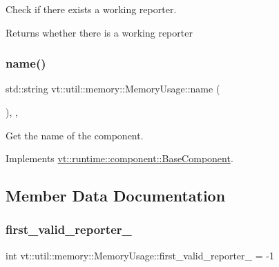 Check if there exists a working reporter. 

\begin{DoxyReturn}{Returns}
whether there is a working reporter 
\end{DoxyReturn}
\mbox{\label{structvt_1_1util_1_1memory_1_1_memory_usage_abd58d8e05874fa3da64e15fef0b9e87f}} 
\subsubsection{\texorpdfstring{name()}{name()}}
{\footnotesize\ttfamily std\+::string vt\+::util\+::memory\+::\+Memory\+Usage\+::name (\begin{DoxyParamCaption}{ }\end{DoxyParamCaption})\hspace{0.3cm}{\ttfamily [inline]}, {\ttfamily [override]}, {\ttfamily [virtual]}}



Get the name of the component. 



Implements \hyperlink{structvt_1_1runtime_1_1component_1_1_base_component_a7701485f3539f78d42e6bad47fc7eb78}{vt\+::runtime\+::component\+::\+Base\+Component}.



\subsection{Member Data Documentation}
\mbox{\label{structvt_1_1util_1_1memory_1_1_memory_usage_a714d3de79740091fce1761c7c0a858bd}} 
\subsubsection{\texorpdfstring{first\+\_\+valid\+\_\+reporter\+\_\+}{first\_valid\_reporter\_}}
{\footnotesize\ttfamily int vt\+::util\+::memory\+::\+Memory\+Usage\+::first\+\_\+valid\+\_\+reporter\+\_\+ = -\/1\hspace{0.3cm}{\ttfamily [private]}}

